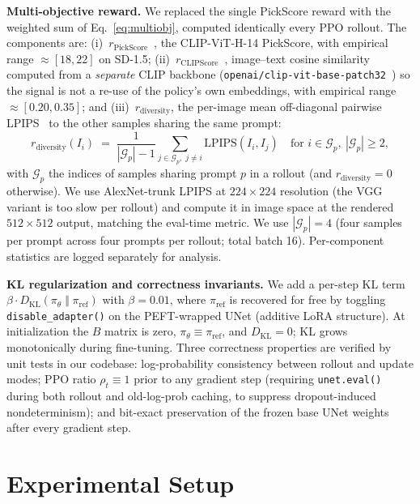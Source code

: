 \documentclass[10pt,letterpaper]{article}
\newcommand{\paragraphhead}[1]{\vspace{0.4ex}\noindent\textbf{#1}\hspace{0.5em}}
\newcommand{\lpips}{\mathrm{LPIPS}}
\newcommand{\pickscore}{\mathrm{PickScore}}
\newcommand{\clipscore}{\mathrm{CLIPScore}}
\begin{document}
\paragraphhead{Multi-objective reward.}
We replaced the single PickScore reward with the weighted sum of Eq.~\ref{eq:multiobj}, computed identically every PPO rollout. The components are: (i)~$r_{\pickscore}$~\citep{Kirstain23}, the CLIP-ViT-H-14 PickScore, with empirical range ${\approx}[18, 22]$ on SD-1.5; (ii)~$r_{\clipscore}$~\citep{Hessel21}, image--text cosine similarity computed from a \emph{separate} CLIP backbone (\texttt{openai/clip-vit-base-patch32}~\citep{Radford21}) so the signal is not a re-use of the policy's own embeddings, with empirical range ${\approx}[0.20, 0.35]$; and (iii)~$r_{\mathrm{diversity}}$, the per-image mean off-diagonal pairwise LPIPS~\citep{Zhang18} to the other samples sharing the same prompt:
\begin{equation}
  r_{\mathrm{diversity}}(I_i) \;=\; \frac{1}{|\mathcal{G}_p| - 1} \!\!\sum_{j \in \mathcal{G}_p,\; j \neq i}\!\! \lpips(I_i, I_j) \quad\text{for } i \in \mathcal{G}_p,\ |\mathcal{G}_p| \geq 2,
  \label{eq:diversity}
\end{equation}
with $\mathcal{G}_p$ the indices of samples sharing prompt $p$ in a rollout (and $r_{\mathrm{diversity}}{=}0$ otherwise). We use AlexNet-trunk LPIPS at $224 \times 224$ resolution (the VGG variant is too slow per rollout) and compute it in image space at the rendered $512\times 512$ output, matching the eval-time metric. We use $|\mathcal{G}_p|=4$ (four samples per prompt across four prompts per rollout; total batch 16). Per-component statistics are logged separately for analysis.

\paragraphhead{KL regularization and correctness invariants.}
We add a per-step KL term $\beta \cdot D_{\mathrm{KL}}(\pi_\theta\;\Vert\;\pi_{\mathrm{ref}})$ with $\beta = 0.01$, where $\pi_{\mathrm{ref}}$ is recovered for free by toggling \texttt{disable\_adapter()} on the PEFT-wrapped UNet (additive LoRA structure). At initialization the $B$ matrix is zero, $\pi_\theta \equiv \pi_{\mathrm{ref}}$, and $D_{\mathrm{KL}} = 0$; KL grows monotonically during fine-tuning. Three correctness properties are verified by unit tests in our codebase: log-probability consistency between rollout and update modes; PPO ratio $\rho_t \equiv 1$ prior to any gradient step (requiring \texttt{unet.eval()} during both rollout and old-log-prob caching, to suppress dropout-induced nondeterminism); and bit-exact preservation of the frozen base UNet weights after every gradient step.

\section{Experimental Setup}
\label{sec:setup}
\end{document}
